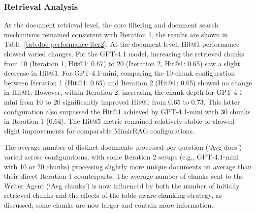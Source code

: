 \documentclass[final,5p,times,twopage,twocolumn,a4paper]{elsarticle}
\begin{document}
\subsubsection{Retrieval Analysis}
\label{sec:iter2-retrieval-analysis}
At the document retrieval level, the core filtering and document search mechanisms remained consistent with Iteration 1, the results are shown in Table~\ref{tab:doc-performance-iter2}. At the document level, Hit@1 performance showed varied changes. For the GPT-4.1 model, increasing the retrieved chunks from 10 (Iteration 1, Hit@1: 0.67) to 20 (Iteration 2, Hit@1: 0.65) saw a slight decrease in Hit@1. For GPT-4.1-mini, comparing the 10-chunk configuration between Iteration 1 (Hit@1: 0.65) and Iteration 2 (Hit@1: 0.65) showed no change in Hit@1. However, within Iteration 2, increasing the chunk depth for GPT-4.1-mini from 10 to 20 significantly improved Hit@1 from 0.65 to 0.73. This latter configuration also surpassed the Hit@1 achieved by GPT-4.1-mini with 30 chunks in Iteration 1 (0.64). The Hit@5 metric remained relatively stable or showed slight improvements for comparable MimirRAG configurations.

The average number of distinct documents processed per question (`Avg docs') varied across configurations, with some Iteration 2 setups (e.g., GPT-4.1-mini with 10 or 20 chunks) processing slightly more unique documents on average than their direct Iteration 1 counterparts. The average number of chunks sent to the Writer Agent (`Avg chunks') is now influenced by both the number of initially retrieved chunks and the effects of the table-aware chunking strategy, as discussed; some chunks are now larger and contain more information.
\end{document}

